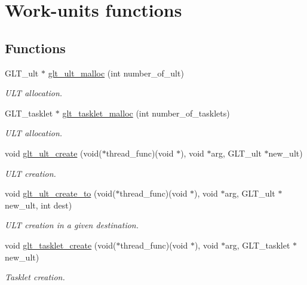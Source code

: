 \hypertarget{group__WORKUNIT}{\section{Work-\/units functions}
\label{group__WORKUNIT}
}
\subsection*{Functions}
\begin{DoxyCompactItemize}
\item 
G\-L\-T\-\_\-ult $\ast$ \hyperlink{group__WORKUNIT_gadcd99b3a31062d6f2f106e7d82430c22}{glt\-\_\-ult\-\_\-malloc} (int number\-\_\-of\-\_\-ult)
\begin{DoxyCompactList}\small\item\em U\-L\-T allocation. \end{DoxyCompactList}\item 
G\-L\-T\-\_\-tasklet $\ast$ \hyperlink{group__WORKUNIT_ga7d7a66d109073ceeb2127e125afda4dc}{glt\-\_\-tasklet\-\_\-malloc} (int number\-\_\-of\-\_\-tasklets)
\begin{DoxyCompactList}\small\item\em U\-L\-T allocation. \end{DoxyCompactList}\item 
void \hyperlink{group__WORKUNIT_ga80b172dbf386dc0af178d2fceccebe8c}{glt\-\_\-ult\-\_\-create} (void($\ast$thread\-\_\-func)(void $\ast$), void $\ast$arg, G\-L\-T\-\_\-ult $\ast$new\-\_\-ult)
\begin{DoxyCompactList}\small\item\em U\-L\-T creation. \end{DoxyCompactList}\item 
void \hyperlink{group__WORKUNIT_ga93c60b3bcaf218ece53c593018d1c22b}{glt\-\_\-ult\-\_\-create\-\_\-to} (void($\ast$thread\-\_\-func)(void $\ast$), void $\ast$arg, G\-L\-T\-\_\-ult $\ast$new\-\_\-ult, int dest)
\begin{DoxyCompactList}\small\item\em U\-L\-T creation in a given destination. \end{DoxyCompactList}\item 
void \hyperlink{group__WORKUNIT_ga9aafb998799703550b114e934e62d300}{glt\-\_\-tasklet\-\_\-create} (void($\ast$thread\-\_\-func)(void $\ast$), void $\ast$arg, G\-L\-T\-\_\-tasklet $\ast$new\-\_\-ult)
\begin{DoxyCompactList}\small\item\em Tasklet creation. \end{DoxyCompactList}\item 

\end{DoxyCompactItemize}

